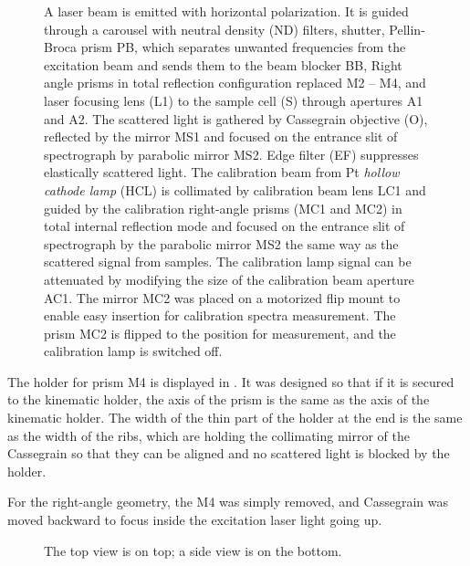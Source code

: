 \begin{figure}
	\centering
	
	\caption[%
		Top-view schema of the apparatus in backscattering configuration
		and with side-view inset of the sample space.%
	]{%
		A laser beam is emitted with horizontal polarization.
		It is guided through
			a carousel with neutral density (ND) filters,
			shutter,
			Pellin-Broca prism PB, which separates unwanted frequencies from the
				excitation beam and sends them to the beam blocker BB,
			Right angle prisms in total reflection configuration replaced M2 -- M4,
			and laser focusing lens (L1)
			to the sample cell (S)
			through apertures A1 and A2.
		The scattered light is
			gathered by Cassegrain objective (O),
			reflected by the mirror MS1
			and focused on the entrance slit of spectrograph by parabolic mirror MS2.
			Edge filter (EF) suppresses elastically scattered light.
		The calibration beam from Pt \emph{hollow cathode lamp} (HCL)
			is collimated by calibration beam lens LC1
			and guided by the calibration right-angle prisms (MC1 and MC2) in total
				internal reflection mode
			and focused on the entrance slit of spectrograph by the parabolic mirror
				MS2 the same way as the scattered signal from samples.
		The calibration lamp signal can be attenuated by modifying the size of the
			calibration beam aperture AC1.
		The mirror MC2 was placed on a motorized flip mount to enable easy
			insertion for calibration spectra measurement.
		The prism MC2 is flipped to the position for measurement, and the
			calibration lamp is switched off.
	}
	\label{\figlabel{backscattering:apparatus_schema}}
\end{figure}

The holder for prism M4 is displayed in
.
It was designed so that if it is secured to the kinematic holder, the axis of
the prism is the same as the axis of the kinematic holder.
The width of the thin part of the holder at the end is the same as the width of
the ribs, which are holding the collimating mirror of the Cassegrain so that
they can be aligned and no scattered light is blocked by the holder.

For the right-angle geometry, the M4 was simply removed, and Cassegrain was
moved backward to focus inside the excitation laser light going up.

\begin{figure}
	\centering
	
	\caption[%
		Backscattering holder.%
	]{%
		The top view is on top; a side view is on the bottom.
	}
	\label{\figlabel{backscattering_holder:drawing}}
\end{figure}

